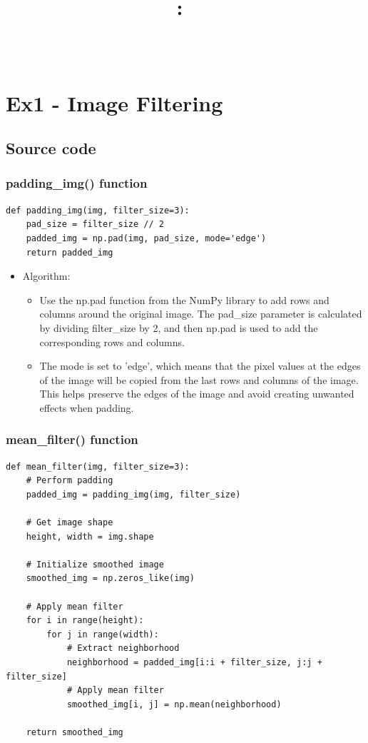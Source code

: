 \documentclass{article}
\title{
\vspace{-1in}
\textmd{\textbf{\hmwkClass:\ \hmwkTitle} \\ \hmwkAuthorName}\\
}
\author{}
\date{}
\begin{document}
\maketitle

\section{Ex1 - Image Filtering}
\subsection{Source code}
\subsubsection{padding\_img() function}
\begin{lstlisting}[caption={Code of padding\_img() function}, label={padding\_img}]
def padding_img(img, filter_size=3):
    pad_size = filter_size // 2
    padded_img = np.pad(img, pad_size, mode='edge')
    return padded_img
\end{lstlisting}

\begin{itemize}
    
    \item Algorithm:
    \begin{itemize}
        \item Use the np.pad function from the NumPy library to add rows and columns around the original image. The pad\_size parameter is calculated by dividing filter\_size by 2, and then np.pad is used to add the corresponding rows and columns.
        \item The mode is set to 'edge', which means that the pixel values at the edges of the image will be copied from the last rows and columns of the image. This helps preserve the edges of the image and avoid creating unwanted effects when padding.
    \end{itemize}
\end{itemize}


\subsubsection{mean\_filter() function}
\begin{lstlisting}[caption={Code of mean\_filter() function}, label={mean\_filter()}]
def mean_filter(img, filter_size=3):
    # Perform padding
    padded_img = padding_img(img, filter_size)

    # Get image shape
    height, width = img.shape

    # Initialize smoothed image
    smoothed_img = np.zeros_like(img)

    # Apply mean filter
    for i in range(height):
        for j in range(width):
            # Extract neighborhood
            neighborhood = padded_img[i:i + filter_size, j:j + filter_size]
            # Apply mean filter
            smoothed_img[i, j] = np.mean(neighborhood)

    return smoothed_img
\end{lstlisting}
\end{document}
